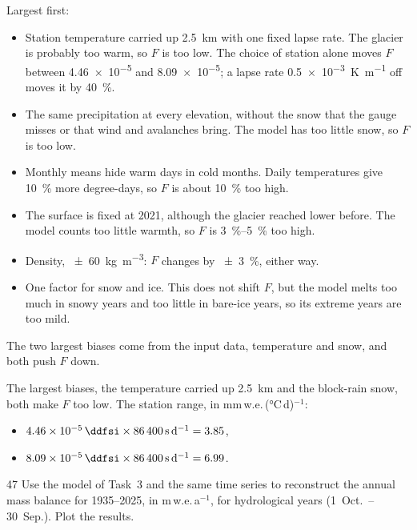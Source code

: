 \documentclass{scrartcl}
\renewcommand\unv[1]{#1}%
\begin{document}
\begin{reportpart}
\unv{Largest first:
\begin{itemize}
  \item Station temperature carried up \qty{2.5}{\kilo\metre} with one fixed lapse rate. The
    glacier is probably too warm, so $F$ is too low. The choice of station alone moves $F$
    between \qty{4.46e-5}{} and \qty{8.09e-5}{\ddfsi}; a lapse rate
    \qty{0.5e-3}{\kelvin\per\metre} off moves it by \qty{40}{\percent}.
  \item The same precipitation at every elevation, without the snow that the gauge misses or
    that wind and avalanches bring. The model has too little snow, so $F$ is too low.
  \item Monthly means hide warm days in cold months. Daily temperatures give
    \qty{10}{\percent} more degree-days, so $F$ is about \qty{10}{\percent} too high.
  \item The surface is fixed at 2021, although the glacier reached lower before. The model
    counts too little warmth, so $F$ is \qtyrange{3}{5}{\percent} too high.
  \item Density, \qty{\pm 60}{\kilo\gram\per\cubic\metre}: $F$ changes by
    \qty{\pm 3}{\percent}, either way.
  \item One factor for snow and ice. This does not shift $F$, but the model melts too much in
    snowy years and too little in bare-ice years, so its extreme years are too mild.
\end{itemize}
The two largest biases come from the input data, temperature and snow, and both push $F$
down.

\begin{converted}
The largest biases, the temperature carried up \qty{2.5}{\kilo\metre} and the block-rain snow,
both make $F$ too low. The station range, in mm\,w.e.\,(\unit{\degreeCelsius}\,d)$^{-1}$:
\begin{itemize}
  \item $\qty{4.46e-5}{\ddfsi} \times \qty{86400}{\second\per\day} = 3.85$,
  \item $\qty{8.09e-5}{\ddfsi} \times \qty{86400}{\second\per\day} = 6.99$.
\end{itemize}
\end{converted}}

\begin{question}{4}{7}\label{q:4}
Use the model of Task~3 and the same time series to reconstruct the annual mass balance for
1935--2025, in m\,w.e.\,a$^{-1}$, for hydrological years (1~Oct.\ -- 30~Sep.). Plot the
results.


\end{question}
\end{reportpart}
\end{document}
